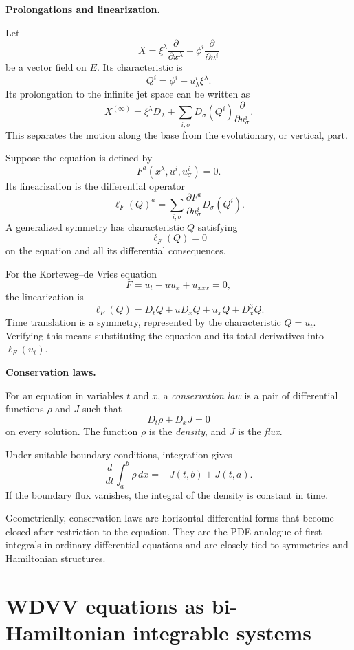 \medskip\noindent
{\bf Prolongations and linearization.}

Let
$$
X=\xi^\lambda
\frac{\partial}{\partial x^\lambda}
+\phi^i\frac{\partial}{\partial u^i}
$$
be a vector field on $E$. Its characteristic
is
$$
Q^i=\phi^i-u^i_\lambda\xi^\lambda.
$$
Its prolongation to the infinite jet space
can be written as
$$
X^{(\infty)}=
\xi^\lambda D_\lambda
+
\sum_{i,\sigma}D_\sigma(Q^i)
\frac{\partial}{\partial u^i_\sigma}.
$$
This separates the motion along the base
from the evolutionary, or vertical, part.

Suppose the equation is defined by
$$
F^a(x^\lambda,u^i,u^i_\sigma)=0.
$$
Its linearization is the differential
operator
$$
\ell_F(Q)^a=
\sum_{i,\sigma}
\frac{\partial F^a}
{\partial u^i_\sigma}D_\sigma(Q^i).
$$
A generalized symmetry has characteristic
$Q$ satisfying
$$
\ell_F(Q)=0
$$
on the equation and all its differential
consequences.

\begin{example}
\label{example-kdv-linearization}
For the Korteweg--de Vries equation
$$
F=u_t+uu_x+u_{xxx}=0,
$$
the linearization is
$$
\ell_F(Q)=
D_tQ+uD_xQ+u_xQ+D_x^3Q.
$$
Time translation is a symmetry, represented
by the characteristic $Q=u_t$. Verifying
this means substituting the equation and
its total derivatives into
$\ell_F(u_t)$.
\end{example}

\medskip\noindent
{\bf Conservation laws.}

\begin{definition}
\label{definition-conservation-law}
For an equation in variables $t$ and $x$,
a \textit{conservation law} is a pair of
differential functions $\rho$ and $J$ such
that
$$
D_t\rho+D_xJ=0
$$
on every solution. The function $\rho$ is
the \textit{density}, and $J$ is the
\textit{flux}.
\end{definition}

Under suitable boundary conditions,
integration gives
$$
\frac{d}{dt}\int_a^b\rho\,dx
=-J(t,b)+J(t,a).
$$
If the boundary flux vanishes, the integral
of the density is constant in time.

Geometrically, conservation laws are
horizontal differential forms that become
closed after restriction to the equation.
They are the PDE analogue of first
integrals in ordinary differential
equations and are closely tied to
symmetries and Hamiltonian structures.

\section{WDVV equations as bi-Hamiltonian
integrable systems}
\label{section-wdvv-bihamiltonian}

